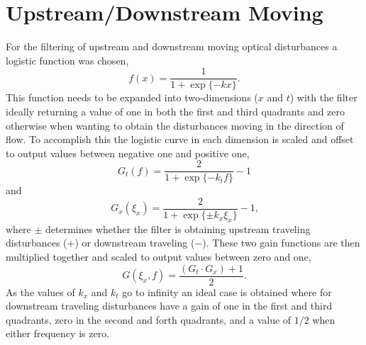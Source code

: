 \section{Upstream/Downstream Moving}
For the filtering of upstream and downstream moving optical disturbances a logistic function was chosen,
\begin{equation}
  f(x) = \frac{1}{1+\exp\{-kx\}} \textrm{.}
  \label{eqn:04_logistic}
\end{equation}
This function needs to be expanded into two-dimensions ($x$ and $t$) with the filter ideally returning a value of one in both the first and third quadrants and zero otherwise when wanting to obtain the disturbances moving in the direction of flow.
To accomplish this the logistic curve in each dimension is scaled and offset to output values between negative one and positive one,
\begin{equation}
  G_t(f) = \frac{2}{1+\exp\{-k_tf\}}-1
  \label{eqn:04_logistic_time}
\end{equation}
and
\begin{equation}
  G_x(\xi_x) = \frac{2}{1+\exp\{\pm k_x\xi_x\}}-1 \textrm{,}
  \label{eqn:04_logistic_space}
\end{equation}
where $\pm$ determines whether the filter is obtaining upstream traveling disturbances ($+$) or downstream traveling ($-$).
These two gain functions are then multiplied together and scaled to output values between zero and one,
\begin{equation}
  G(\xi_x,f) = \frac{(G_t\cdot G_x)+1}{2} \textrm{.}
  \label{eqn:04_up_down_filter}
\end{equation}
As the values of $k_x$ and $k_t$ go to infinity an ideal case is obtained where for downstream traveling disturbances have a gain of one in the first and third quadrants, zero in the second and forth quadrants, and a value of $1/2$ when either frequency is zero.

